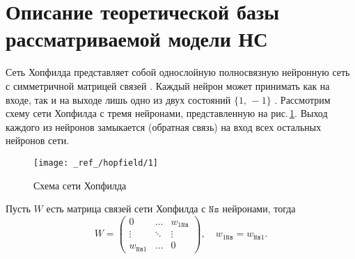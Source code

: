 \documentclass[12pt,a4paper]{article}
\newcommand{\ns}{\texttt{Ns}}
\begin{document}
\section{Описание теоретической базы рассматриваемой \newline модели НС}
Сеть Хопфилда представляет собой однослойную полносвязную нейронную сеть с симметричной матрицей связей \cite{hopfield1982}. 
Каждый нейрон может принимать как на входе, так и на выходе лишь одно из двух состояний $\{1,\,-1\}$ . 
Рассмотрим схему сети Хопфилда с тремя нейронами, представленную на
рис.\,\ref{fig:01}. Выход каждого из нейронов замыкается (обратная связь) на вход всех остальных нейронов сети.


\begin{figure}[h!]
	\centering
	\texttt{[image: \_ref\_/hopfield/1]}
	\caption{Схема сети Хопфилда\label{fig:01}}
\end{figure}



Пусть $W$ есть матрица связей сети Хопфилда с $\ns$ нейронами, тогда
\begin{equation*}
W = 
\begin{pmatrix}
0 & \ldots & w_{1\ns} \\
\vdots & \ddots & \vdots \\
w_{\ns 1} & \ldots & 0
\end{pmatrix},
\quad
w_{1\ns} = w_{\ns 1}.
\end{equation*}
\end{document}
